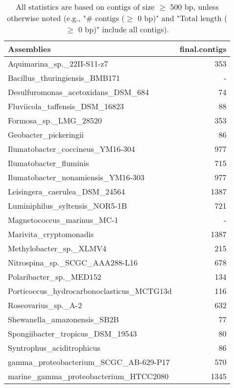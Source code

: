 \documentclass[12pt,a4paper]{article}
\begin{document}
\begin{table}[ht]
\begin{center}
\caption{All statistics are based on contigs of size $\geq$ 500 bp, unless otherwise noted (e.g., "\# contigs ($\geq$ 0 bp)" and "Total length ($\geq$ 0 bp)" include all contigs).}
\begin{tabular}{|l*{1}{|r}|}
\hline
Assemblies & final.contigs \\ \hline
Aquimarina\_sp.\_22II-S11-z7 & 353 \\ \hline
Bacillus\_thuringiensis\_BMB171 & - \\ \hline
Desulfuromonas\_acetoxidans\_DSM\_684 & 74 \\ \hline
Fluviicola\_taffensis\_DSM\_16823 & 88 \\ \hline
Formosa\_sp.\_LMG\_28520 & 353 \\ \hline
Geobacter\_pickeringii & 86 \\ \hline
Ilumatobacter\_coccineus\_YM16-304 & 977 \\ \hline
Ilumatobacter\_fluminis & 715 \\ \hline
Ilumatobacter\_nonamiensis\_YM16-303 & 977 \\ \hline
Leisingera\_caerulea\_DSM\_24564 & 1387 \\ \hline
Luminiphilus\_syltensis\_NOR5-1B & 721 \\ \hline
Magnetococcus\_marinus\_MC-1 & - \\ \hline
Marivita\_cryptomonadis & 1387 \\ \hline
Methylobacter\_sp.\_XLMV4 & 215 \\ \hline
Nitrospina\_sp.\_SCGC\_AAA288-L16 & 678 \\ \hline
Polaribacter\_sp.\_MED152 & 134 \\ \hline
Porticoccus\_hydrocarbonoclasticus\_MCTG13d & 116 \\ \hline
Roseovarius\_sp.\_A-2 & 632 \\ \hline
Shewanella\_amazonensis\_SB2B & 77 \\ \hline
Spongiibacter\_tropicus\_DSM\_19543 & 80 \\ \hline
Syntrophus\_aciditrophicus & 86 \\ \hline
gamma\_proteobacterium\_SCGC\_AB-629-P17 & 570 \\ \hline
marine\_gamma\_proteobacterium\_HTCC2080 & 1345 \\ \hline
\end{tabular}
\end{center}
\end{table}
\end{document}
